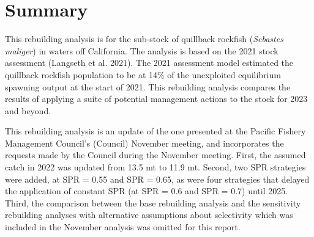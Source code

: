 \documentclass[11pt,
  english,
  letterpaper,
]{article}
\begin{document}
\newcommand{\lt}{\ensuremath <}
\newcommand{\gt}{\ensuremath >}

\pagebreak
{}
\setcounter{page}{1}

\renewcommand{\thetable}{\roman{table}}
\renewcommand{\thefigure}{\roman{figure}}

\setlength\parskip{0.5em plus 0.1em minus 0.2em}

\pagebreak


\hypertarget{summary}{%
\section*{Summary}\label{summary}}

\leavevmode\tagmcend\tagstructend


This rebuilding analysis is for the sub-stock of quillback rockfish (\emph{Sebastes maliger}) in waters off California. The analysis is based on the 2021 stock assessment {(Langseth et al. 2021)\leavevmode\tagmcend\tagstructend}. The 2021 assessment model estimated the quillback rockfish population to be at 14\% of the unexploited equilibrium spawning output at the start of 2021. This rebuilding analysis compares the results of applying a suite of potential management actions to the stock for 2023 and beyond.

\leavevmode\tagmcend\tagstructend\par


This rebuilding analysis is an update of the one presented at the Pacific Fishery Management Council's (Council) November meeting, and incorporates the requests made by the Council during the November meeting. First, the assumed catch in 2022 was updated from 13.5 mt to 11.9 mt. Second, two SPR strategies were added, at SPR = 0.55 and SPR = 0.65, as were four strategies that delayed the application of constant SPR (at SPR = 0.6 and SPR = 0.7) until 2025. Third, the comparison between the base rebuilding analysis and the sensitivity rebuilding analyses with alternative assumptions about selectivity which was included in the November analysis was omitted for this report.

\leavevmode\tagmcend\tagstructend\par
\end{document}

